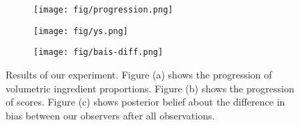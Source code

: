 \begin{figure}
    \centering
    \begin{subfigure}[b]{0.32\textwidth}
        \centering
        \texttt{[image: fig/progression.png]}
        \caption{}
        \label{subfig:exp:progression}
    \end{subfigure}
    \hfill
    \begin{subfigure}[b]{0.32\textwidth}
        \centering
        \texttt{[image: fig/ys.png]}
        \caption{}
        \label{subfig:exp:ys}
    \end{subfigure}
    \hfill
    \begin{subfigure}[b]{0.32\textwidth}
        \centering
        \texttt{[image: fig/bais-diff.png]}
        \caption{}
        \label{subfig:exp:bias-diff}
    \end{subfigure}
    \hfill
    \caption{
        Results of our experiment.
        Figure (a) shows the progression of volumetric ingredient proportions.
        Figure (b) shows the progression of scores.
        Figure (c) shows posterior belief about the difference in bias between our observers after all observations.
    }
    \label{fig:exp-res}
\end{figure}
